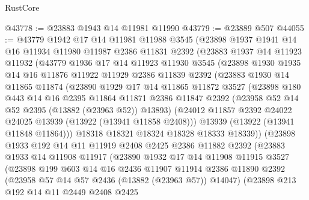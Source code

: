 \begin{lexlean}{RustCore}
\begin{coremodule}
@43778 := @23883 @1943 @14 @11981 @11990
@43779 := @23889 @507
@44055 := @43779
    @1942
    @17
    @14
    @11981
    @11988
    @3545
    (@23898
      @1937
      @1941
      @14
      @16
      @11934
      @11980
      @11987
      @2386
      @11831
      @2392
      (@23883
        @1937
        @14
        @11923
        @11932
        (@43779
          @1936
          @17
          @14
          @11923
          @11930
          @3545
          (@23898
            @1930
            @1935
            @14
            @16
            @11876
            @11922
            @11929
            @2386
            @11839
            @2392
            (@23883
              @1930
              @14
              @11865
              @11874
              (@23890
                @1929
                @17
                @14
                @11865
                @11872
                @3527
                (@23898
                  @180
                  @443
                  @14
                  @16
                  @2395
                  @11864
                  @11871
                  @2386
                  @11847
                  @2392
                  (@23958 @52 @14 @52 @2395 (@13882 (@23963 @52)) @13893)
                  (@24012 @11857 @2392 @24022 @24025 @13939 (@13922 (@13941 @11858 @2408)))
                  @13939
                  (@13922 (@13941 @11848 @11864)))
                @18318
                @18321
                @18324
                @18328
                @18333
                @18339))
            (@23898
              @1933
              @192
              @14
              @11
              @11919
              @2408
              @2425
              @2386
              @11882
              @2392
              (@23883
                @1933
                @14
                @11908
                @11917
                (@23890
                  @1932
                  @17
                  @14
                  @11908
                  @11915
                  @3527
                  (@23898
                    @199
                    @603
                    @14
                    @16
                    @2436
                    @11907
                    @11914
                    @2386
                    @11890
                    @2392
                    (@23958 @57 @14 @57 @2436 (@13882 (@23963 @57)) @14047)
                    (@23898
                      @213
                      @192
                      @14
                      @11
                      @2449
                      @2408
                      @2425

\end{coremodule}
\end{lexlean}
